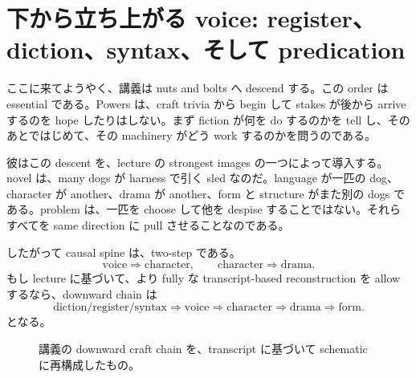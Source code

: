\section{下から立ち上がる voice: register、diction、syntax、そして predication}

ここに来てようやく、講義は nuts and bolts へ descend する。この order は essential である。Powers は、craft trivia から begin して stakes が後から arrive するのを hope したりはしない。まず fiction が何を do するのかを tell し、そのあとではじめて、その machinery がどう work するのかを問うのである。

彼はこの descent を、lecture の strongest images の一つによって導入する。novel は、many dogs が harness で引く sled なのだ。language が一匹の dog、character が another、drama が another、form と structure がまた別の dogs である。problem は、一匹を choose して他を despise することではない。それらすべてを same direction に pull させることなのである。

したがって causal spine は、two-step である。
\begin{equation}
\text{voice} \Rightarrow \text{character},\qquad
\text{character} \Rightarrow \text{drama}.
\end{equation}
もし lecture に基づいて、より fully な transcript-based reconstruction を allow するなら、downward chain は
\begin{equation}
\text{diction/register/syntax} \Rightarrow \text{voice} \Rightarrow \text{character} \Rightarrow \text{drama} \Rightarrow \text{form}.
\end{equation}
となる。

\begin{figure}[h]
\centering
{}
\caption{講義の downward craft chain を、transcript に基づいて schematic に再構成したもの。}
\end{figure}

